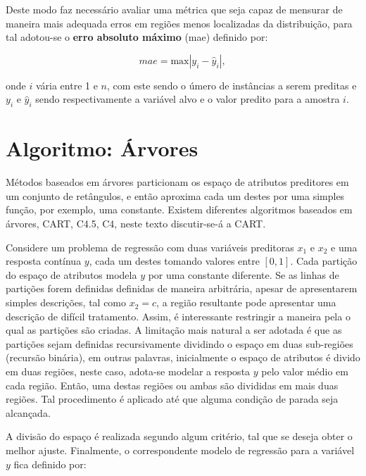 
Deste modo faz necessário avaliar uma métrica que seja capaz de mensurar de maneira mais adequada erros em regiões menos localizadas da distribuição, para tal adotou-se o {\bf erro absoluto máximo} (mae) definido por:

\begin{equation}
mae=\mbox{max}|y_{i}-\hat{y}_i|\mbox{,}~
\end{equation}

onde $i$ vária entre 1 e $n$, com este sendo o úmero de instâncias a serem preditas e $y_i$ e $\hat{y}_i$ sendo respectivamente a variável alvo e o valor predito para a amostra $i$.

\section{Algoritmo: Árvores}

Métodos baseados em árvores particionam os espaço de atributos preditores em um conjunto de retângulos, e então aproxima cada um destes por uma simples função, por exemplo, uma constante. Existem diferentes algoritmos baseados em árvores, CART, C4.5, C4, neste texto discutir-se-á a CART.

Considere um problema de regressão com duas variáveis preditoras $x_1$ e $x_2$ e uma resposta contínua $y$, cada um destes tomando valores entre $[0,1]$. Cada partição do espaço de atributos modela $y$ por uma constante diferente. Se as linhas de partições forem definidas definidas de maneira arbitrária, apesar de apresentarem simples descrições, tal como $x_2=c$, a região resultante pode apresentar uma descrição de difícil tratamento. Assim, é interessante restringir a maneira pela o qual as partições são criadas. A limitação mais natural a ser adotada é que as partições sejam definidas recursivamente dividindo o espaço em duas sub-regiões (recursão binária), em outras palavras, inicialmente o espaço de atributos é divido em duas regiões, neste caso, adota-se modelar a resposta $y$ pelo valor médio em cada região. Então, uma destas regiões ou ambas são divididas em mais duas regiões. Tal procedimento é aplicado até que alguma condição de parada seja alcançada. 

A divisão do espaço é realizada segundo algum critério, tal que se deseja obter o melhor ajuste. Finalmente, o correspondente modelo de regressão para a variável $y$ fica definido por:

